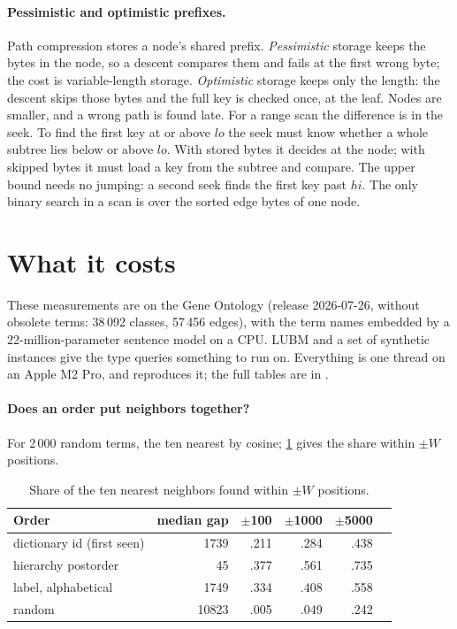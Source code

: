 \paragraph{Pessimistic and optimistic prefixes.} Path compression stores a node's
shared prefix. \emph{Pessimistic} storage keeps the bytes in the node, so a
descent compares them and fails at the first wrong byte; the cost is
variable-length storage. \emph{Optimistic} storage keeps only the length: the
descent skips those bytes and the full key is checked once, at the leaf. Nodes are
smaller, and a wrong path is found late. For a range scan the difference is in the
seek. To find the first key at or above $\mathit{lo}$ the seek must know whether a
whole subtree lies below or above $\mathit{lo}$. With stored bytes it decides at the
node; with skipped bytes it must load a key from the subtree and compare. The
upper bound needs no jumping: a second seek finds the first key past $\mathit{hi}$.
The only binary search in a scan is over the sorted edge bytes of one node.

\section{What it costs}
\label{sec:semantic-measure}

These measurements are on the Gene Ontology (release 2026-07-26, without
obsolete terms: 38\,092 classes, 57\,456  edges), with the term names
embedded by a 22-million-parameter sentence model on a CPU. LUBM and a set of
synthetic instances give the type queries something to run on. Everything is
one thread on an Apple M2 Pro, and  reproduces
it; the full tables are in .

\paragraph{Does an order put neighbors together?} For 2\,000 random terms, the
ten nearest by cosine; \cref{tab:semantic-order} gives the share within $\pm W$
positions.

\begin{table}[ht]
\centering\small
\begin{tabular}{@{}lrrrrr@{}}
\toprule
Order & median gap & $\pm$100 & $\pm$1000 & $\pm$5000 \\
\midrule
dictionary id (first seen) & 1739 & .211 & .284 & .438 \\
hierarchy postorder & 45 & .377 & .561 & .735 \\
label, alphabetical & 1749 & .334 & .408 & .558 \\
random & 10823 & .005 & .049 & .242 \\
\bottomrule
\end{tabular}
\caption{Share of the ten nearest neighbors found within $\pm W$ positions.}
\label{tab:semantic-order}
\end{table}

